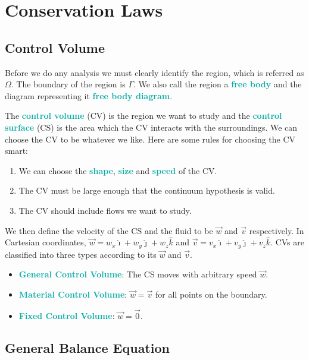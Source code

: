 \documentclass[twoside]{article}
\newcommand{\highlightbluetext}[1]{\textcolor[HTML]{09ACA6}{\textbf{#1}}}
\numberwithin{equation}{section}
\begin{document}
	\newpage
	
	\section{Conservation Laws}
	\label{sec:ConservationLaws}
	
	\subsection{Control Volume}
	\label{subsec:ControlVolume}
	
	Before we do any analysis we must clearly identify the region, which is referred as $\Omega$. The boundary of the region is $\Gamma$. We also call the region a \highlightbluetext{free body} and the diagram representing it \highlightbluetext{free body diagram}.
	
	The \highlightbluetext{control volume} (CV) is the region we want to study and the \highlightbluetext{control surface} (CS) is the area which the CV interacts with the surroundings. We can choose the CV to be whatever we like. Here are some rules for choosing the CV smart:
	\begin{enumerate}
		\item We can choose the \highlightbluetext{shape}, \highlightbluetext{size} and \highlightbluetext{speed} of the CV.
		\item The CV must be large enough that the continuum hypothesis is valid.
		\item The CV should include flows we want to study.
	\end{enumerate}
	We then define the velocity of the CS and the fluid to be $\vec{w}$ and $\vec{v}$ respectively. In Cartesian coordinates, $\vec{w} = w_x \hat{\imath}+w_y \hat{\jmath}+w_z \hat{k}$ and $\vec{v} = v_x \hat{\imath}+v_y \hat{\jmath}+v_z \hat{k}$. CVs are classified into three types according to its $\vec{w}$ and $\vec{v}$.
	\begin{itemize}
		\item \highlightbluetext{General Control Volume}: The CS moves with arbitrary speed $\vec{w}$.
		\item \highlightbluetext{Material Control Volume}: $\vec{w} = \vec{v}$ for all points on the boundary.
		\item \highlightbluetext{Fixed Control Volume}: $\vec{w} = \vec{0}$.
	\end{itemize}
	
	\subsection{General Balance Equation}
	\label{subsec:GeneralBalanceEquation}
	
\end{document}
